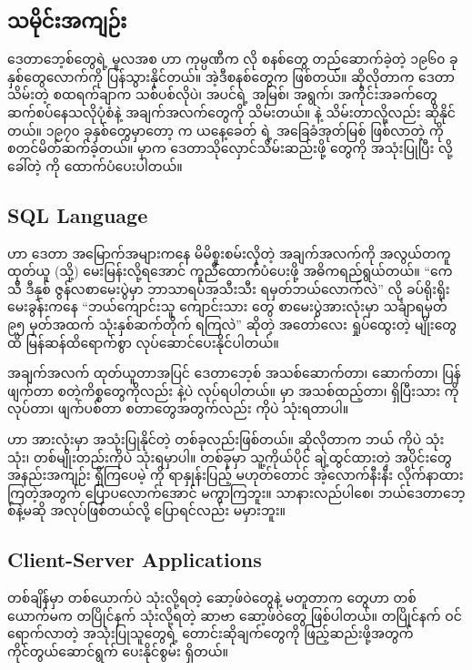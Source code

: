 \subsection*{သမိုင်းအကျဉ်း}
ဒေတာဘေ့စ်တွေရဲ့ မူလအစ  ဟာ  ကုမ္ပဏီက  လို စနစ်တွေ တည်ဆောက်ခဲ့တဲ့ ၁၉၆၀ ခုနှစ်တွေလောက်ကို ပြန်သွားနိုင်တယ်။ အဲ့ဒီစနစ်တွေက  ဖြစ်တယ်။ ဆိုလိုတာက ဒေတာသိမ်းတဲ့ စထရက်ချာက သစ်ပစ်လိုပဲ၊ အပင်ရဲ့ အမြစ်၊ အရွက်၊ အကိုင်းအခက်တွေ ဆက်စပ်နေသလိုပုံစံနဲ့ အချက်အလက်တွေကို သိမ်းတယ်။  နဲ့ သိမ်းတာလို့လည်း ဆိုနိုင်တယ်။ ၁၉၇၀ ခုနှစ်တွေမှာတော့  က ယနေ့ခေတ်  ရဲ့ အခြေခံအုတ်မြစ် ဖြစ်လာတဲ့  ကို စတင်မိတ်ဆက်ခဲ့တယ်။  မှာက ဒေတာသိုလှောင်သိမ်းဆည်းဖို့  တွေကို အသုံးပြုပြီး  လို့ခေါ်တဲ့  ကို ထောက်ပံပေးပါတယ်။ 

\subsection*{SQL Language}
 ဟာ   ဒေတာ အမြောက်အများကနေ မိမိစူးစမ်းလိုတဲ့ အချက်အလက်ကို အလွယ်တကူ ထုတ်ယူ (သို့) မေးမြန်းလို့ရအောင် ကူညီထောက်ပံပေးဖို့ အဓိကရည်ရွယ်တယ်။ “ကေသီ ဒီနှစ် ဇွန်လစာမေးပွဲမှာ ဘာသာရပ်အသီးသီး ရမှတ်ဘယ်လောက်လဲ” လို  ခပ်ရိုးရိုး မေးခွန်းကနေ “ဘယ်ကျောင်းသူ ကျောင်းသား တွေ စာမေးပွဲအားလုံးမှာ သင်္ချာရမှတ် ၉၅ မှတ်အထက် သုံးနှစ်ဆက်တိုက် ရကြလဲ” ဆိုတဲ့ အတော်လေး ရှုပ်ထွေးတဲ့   မျိုးတွေထိ မြန်ဆန်ထိရောက်စွာ လုပ်ဆောင်ပေးနိုင်ပါတယ်။ 

အချက်အလက် ထုတ်ယူတာအပြင် ဒေတာဘေ့စ် အသစ်ဆောက်တာ၊  ဆောက်တာ၊ ပြန်ဖျက်တာ စတဲ့ကိစ္စတွေကိုလည်း  နဲ့ပဲ လုပ်ရပါတယ်။  မှာ  အသစ်ထည့်တာ၊ ရှိပြီးသား  ကို  လုပ်တာ၊ ဖျက်ပစ်တာ စတာတွေအတွက်လည်း  ကိုပဲ သုံးရတာပါ။ 

 ဟာ  အားလုံးမှာ အသုံးပြုနိုင်တဲ့  တစ်ခုလည်းဖြစ်တယ်။ ဆိုလိုတာက ဘယ်  ကိုပဲ သုံးသုံး၊  တစ်မျိုးတည်းကိုပဲ သုံးရမှာပါ။  တစ်ခုမှာ သူ့ကိုယ်ပိုင် ချဲ့ထွင်ထားတဲ့ အပိုင်းတွေ အနည်းအကျဉ်း ရှိကြပေမဲ့  ကို ရာနှုန်းပြည့် မဟုတ်တောင် အဲ့လောက်နီးနီး လိုက်နာထားကြတဲ့အတွက် ပြောပလောက်အောင် မကွာကြဘူး။  သာနားလည်ပါစေ၊ ဘယ်ဒေတာဘေ့စ်နဲ့မဆို အလုပ်ဖြစ်တယ်လို့ ပြောရင်လည်း မမှားဘူး။

\subsection*{Client-Server Applications}
တစ်ချိန်မှာ တစ်ယောက်ပဲ သုံးလို့ရတဲ့ ဆော့ဖ်ဝဲတွေနဲ့ မတူတာက  တွေဟာ တစ်ယောက်မက တပြိုင်နက် သုံးလို့ရတဲ့ ဆာဗာ  ဆော့ဖ်ဝဲတွေ ဖြစ်ပါတယ်။ တပြိုင်နက် ဝင်ရောက်လာတဲ့ အသုံးပြုသူတွေရဲ့ တောင်းဆိုချက်တွေကို ဖြည့်ဆည်းဖို့အတွက် ကိုင်တွယ်ဆောင်ရွက် ပေးနိုင်စွမ်း ရှိတယ်။ 

